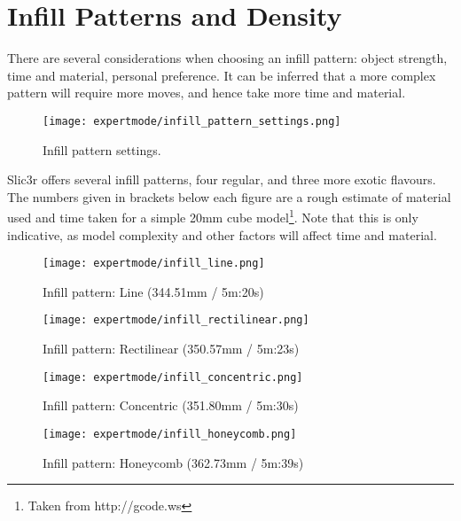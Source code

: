 
\section{Infill Patterns and Density} %
\label{sec:infill_patterns_and_density}

There are several considerations when choosing an infill pattern: object strength, time and material, personal preference.  It can be inferred that a more complex pattern will require more moves, and hence take more time and material.  

\begin{figure}[H]
\centering
\texttt{[image: expertmode/infill\_pattern\_settings.png]}
\caption{Infill pattern settings.}
\label{fig:infill_pattern_settings}
\end{figure}

Slic3r offers several infill patterns, four regular, and three more exotic flavours.  The numbers given in brackets below each figure are a rough estimate of material used and time taken for a simple 20mm cube model\footnote{Taken from http://gcode.ws}.  Note that this is only indicative, as model complexity and other factors will affect time and material.

\begin{figure}[H]
\centering
\texttt{[image: expertmode/infill\_line.png]}
\caption{Infill pattern: Line (344.51mm / 5m:20s)}
\label{fig:infill_line}
\end{figure}

\begin{figure}[H]
\centering
\texttt{[image: expertmode/infill\_rectilinear.png]}
\caption{Infill pattern: Rectilinear (350.57mm / 5m:23s)}
\label{fig:infill_rectilinear}
\end{figure}

\begin{figure}[H]
\centering
\texttt{[image: expertmode/infill\_concentric.png]}
\caption{Infill pattern: Concentric (351.80mm / 5m:30s)}
\label{fig:infill_concentric}
\end{figure}

\begin{figure}[H]
\centering
\texttt{[image: expertmode/infill\_honeycomb.png]}
\caption{Infill pattern: Honeycomb (362.73mm / 5m:39s)}
\label{fig:infill_honeycomb}
\end{figure}

